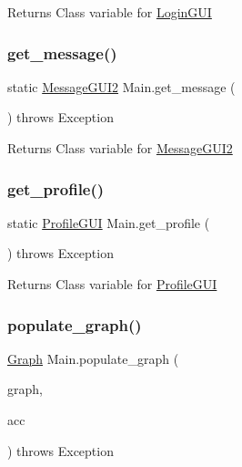 \begin{DoxyReturn}{Returns}
Class variable for \hyperlink{class_login_g_u_i}{Login\+G\+UI} 
\end{DoxyReturn}
\mbox{\label{class_main_a21b6962a0baf060031b59f4966ff6abf}} 
\subsubsection{\texorpdfstring{get\+\_\+message()}{get\_message()}}
{\footnotesize\ttfamily static \hyperlink{class_message_g_u_i2}{Message\+G\+U\+I2} Main.\+get\+\_\+message (\begin{DoxyParamCaption}{ }\end{DoxyParamCaption}) throws Exception\hspace{0.3cm}{\ttfamily [static]}}

\begin{DoxyReturn}{Returns}
Class variable for \hyperlink{class_message_g_u_i2}{Message\+G\+U\+I2} 
\end{DoxyReturn}
\mbox{\label{class_main_a73e8f5786c0c767bdc6f236199bddd70}} 
\subsubsection{\texorpdfstring{get\+\_\+profile()}{get\_profile()}}
{\footnotesize\ttfamily static \hyperlink{class_profile_g_u_i}{Profile\+G\+UI} Main.\+get\+\_\+profile (\begin{DoxyParamCaption}{ }\end{DoxyParamCaption}) throws Exception\hspace{0.3cm}{\ttfamily [static]}}

\begin{DoxyReturn}{Returns}
Class variable for \hyperlink{class_profile_g_u_i}{Profile\+G\+UI} 
\end{DoxyReturn}
\mbox{\label{class_main_a5fd22f13b47ed4f7f56283461f2d8738}} 
\subsubsection{\texorpdfstring{populate\+\_\+graph()}{populate\_graph()}}
{\footnotesize\ttfamily \hyperlink{class_graph}{Graph} Main.\+populate\+\_\+graph (\begin{DoxyParamCaption}\item[{\hyperlink{class_graph}{Graph}}]{graph,  }\item[{Array\+List$<$ \hyperlink{class_account}{Account} $>$}]{acc }\end{DoxyParamCaption}) throws Exception}



